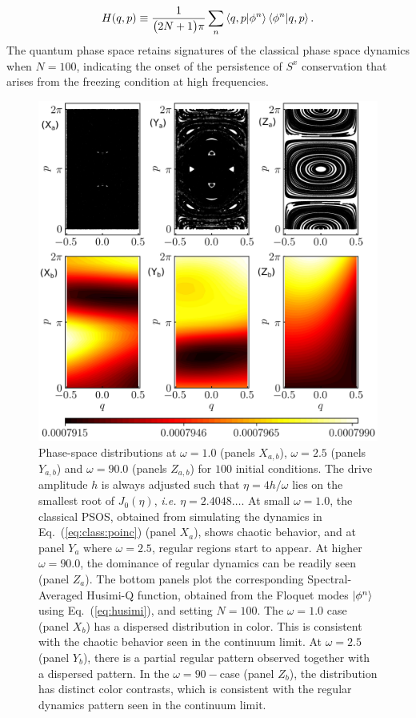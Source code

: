 \documentclass[%
reprint,
superscriptaddress,
amsmath,amssymb,
aps,
prb,
showkeys,
]{revtex4-2}
\begin{document}
\begin{equation}
	H(q,p)\equiv \frac{1}{\big(2N+1\big)\pi}\sum_n \ip{q,p}{\phi^n}\ip{\phi^n}{q,p}.
	\label{eq:husimi}
\end{equation}
The quantum phase space retains signatures of the classical phase space dynamics when $N=100$, indicating the onset of the persistence of $S^x$ conservation that arises from the freezing condition at high frequencies. 
\begin{figure}[t!]
	\centering
	\includegraphics[width = 9.0 cm]{figure_8.jpeg}
	\caption{Phase-space distributions at $\omega=1.0$ (panels $X_{a,b}$), $\omega=2.5$ (panels $Y_{a,b}$) and $\omega=90.0$ (panels $Z_{a,b}$) for $100$ initial conditions. The drive amplitude $h$ is always adjusted such that $\eta=4h/\omega$ lies on the smallest root of $J_0(\eta)$, \textit{i.e.} $\eta=2.4048\dots$. At small $\omega=1.0$, the classical PSOS, obtained from simulating the dynamics in Eq.~(\ref{eq:class:poinc}) (panel $X_{a}$),  shows chaotic behavior, and at panel $Y_{a}$ where $\omega = 2.5$, regular regions start to appear. At higher $\omega = 90.0$, the dominance of regular dynamics can be readily seen (panel $Z_{a}$). The bottom panels plot the corresponding Spectral-Averaged Husimi-Q function, obtained from the Floquet modes $\ket{\phi^n}$ using Eq.~(\ref{eq:husimi}), and setting $N=100$. The $\omega=1.0$ case (panel $X_{b}$) has a dispersed distribution in color. This is consistent with the chaotic behavior seen in the continuum limit. At $\omega = 2.5$ (panel $Y_{b}$), there is a partial regular pattern observed together with a dispersed pattern. In the $\omega=90-$case (panel $Z_{b}$), the distribution has distinct color contrasts, which is consistent with the regular dynamics pattern seen in the continuum limit.}
	\label{fig:classical_lipkin}
\end{figure}
\end{document}

